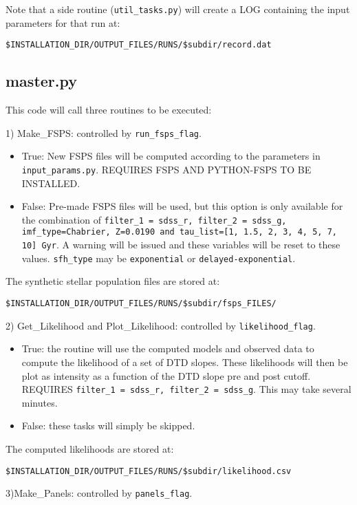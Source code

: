 \documentclass[manuscript]{aastex}
\begin{document}
Note that a side routine (\texttt{util\_tasks.py}) will create a LOG containing the input parameters for that run at:

\texttt{\$INSTALLATION\_DIR/OUTPUT\_FILES/RUNS/\$subdir/record.dat}

\subsection{master.py}
\label{subsec:master}

This code will call three routines to be executed:

1) Make\_FSPS: controlled by \texttt{run\_fsps\_flag}.

\begin{itemize}
\item True: New FSPS files will be computed according to the parameters in \texttt{input\_params.py}. REQUIRES FSPS AND PYTHON-FSPS TO BE INSTALLED.
\item False: Pre-made FSPS files will be used, but this option is only available for the combination of \texttt{filter\_1 = sdss\_r, filter\_2 = sdss\_g, imf\_type=Chabrier, Z=0.0190 and tau\_list=[1, 1.5, 2, 3, 4, 5, 7, 10] Gyr}. A warning will be issued and these variables will be reset to these values. \texttt{sfh\_type} may be \texttt{exponential} or \texttt{delayed-exponential}.
\end{itemize}

The synthetic stellar population files are stored at:

\texttt{\$INSTALLATION\_DIR/OUTPUT\_FILES/RUNS/\$subdir/fsps\_FILES/}

2) Get\_Likelihood and Plot\_Likelihood: controlled by \texttt{likelihood\_flag}.

\begin{itemize}
\item True: the routine will use the computed models and observed data to compute the likelihood of a set of DTD slopes. These likelihoods will then be plot as intensity as a function of the DTD slope pre and post cutoff. REQUIRES \texttt{filter\_1 = sdss\_r, filter\_2 = sdss\_g}. This may take several minutes.
\item False: these tasks will simply be skipped.
\end{itemize}

The computed likelihoods are stored at: 

\texttt{\$INSTALLATION\_DIR/OUTPUT\_FILES/RUNS/\$subdir/likelihood.csv}

3)Make\_Panels: controlled by \texttt{panels\_flag}.
\end{document}
